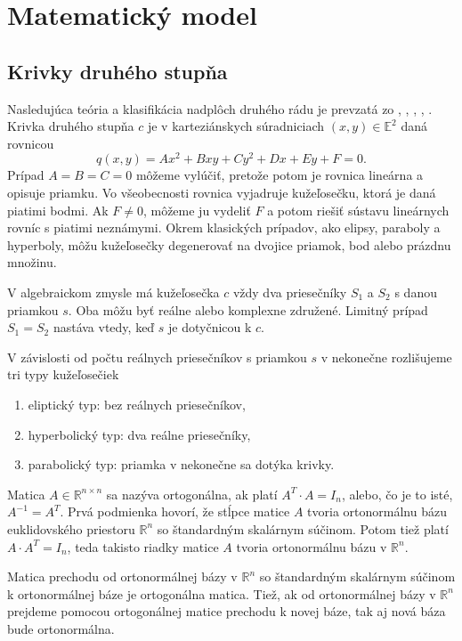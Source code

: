 \chapter{Matematický model}
\label{kap:matematicky_model}
\section{Krivky druhého stupňa}
Nasledujúca teória a klasifikácia nadplôch druhého rádu je prevzatá zo \cite{Ivan}, \cite{Kor13}, \cite{Gla16}, \cite{Ode20}, \cite{Zla11}.
Krivka druhého stupňa $c$ je v karteziánskych súradniciach $(x, y) \in \mathbb{E}^2$ daná rovnicou 
$$ q(x, y) = Ax^2 + Bxy + Cy^2 + Dx + Ey + F = 0.$$
Prípad $A = B = C = 0$  môžeme vylúčiť, pretože potom je rovnica lineárna a opisuje priamku. Vo všeobecnosti rovnica vyjadruje kužeľosečku, ktorá je daná piatimi bodmi. Ak $F \neq 0$, môžeme ju vydeliť $F$ a potom riešiť sústavu lineárnych rovníc s piatimi neznámymi. Okrem klasických prípadov, ako elipsy, paraboly a hyperboly, môžu kužeľosečky degenerovať na dvojice priamok, bod alebo prázdnu množinu.

V algebraickom zmysle má kužeľosečka $c$ vždy dva priesečníky $S_1$ a $S_2$ s danou priamkou $s$. Oba môžu byť reálne alebo komplexne združené. Limitný prípad $S_1 = S_2$ nastáva vtedy, keď $s$ je dotyčnicou k $c$.

V závislosti od počtu reálnych priesečníkov s priamkou $s$ v nekonečne rozlišujeme tri typy kužeľosečiek 
\begin{enumerate}
\item eliptický typ: bez reálnych priesečníkov,
\item hyperbolický typ: dva reálne priesečníky,
\item parabolický typ: priamka v nekonečne sa dotýka krivky.
\end{enumerate}

Matica $A \in \mathbb{R}^{n \times n}$ sa nazýva ortogonálna, ak platí $A^T \cdot A = I_n$, alebo, čo je to isté, $A^{-1} = A^T$. Prvá podmienka hovorí, že stĺpce matice $A$ tvoria ortonormálnu bázu euklidovského priestoru $\mathbb{R}^n$ so štandardným skalárnym súčinom. Potom tiež platí $A \cdot A^T = I_n$, teda takisto riadky matice $A$ tvoria ortonormálnu bázu v $\mathbb{R}^n$. 

\begin{theorem} 
Matica prechodu od ortonormálnej bázy v $\mathbb{R}^n$ so štandardným skalárnym súčinom k ortonormálnej báze je ortogonálna matica. Tiež, ak od ortonormálnej bázy v $\mathbb{R}^n$ prejdeme pomocou ortogonálnej matice prechodu k novej báze,
tak aj nová báza bude ortonormálna.
\end{theorem}

